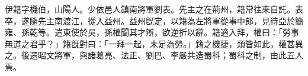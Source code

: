 
\begin{pinyinscope}
伊籍字機伯，山陽人。少依邑人鎮南將軍劉表。先主之在荊州，籍常往來自託。表卒，遂隨先主南渡江，從入益州。益州旣定，以籍為左將軍從事中郎，見待亞於簡雍、孫乾等。遣東使於吳，孫權聞其才辯，欲逆折以辭。籍適入拜，權曰：「勞事無道之君乎？」籍旣對曰：「一拜一起，未足為勞。」籍之機捷，類皆如此，權甚異之。後遷昭文將軍，與諸葛亮、法正、劉巴、李嚴共造蜀科；蜀科之制，由此五人焉。


\end{pinyinscope}